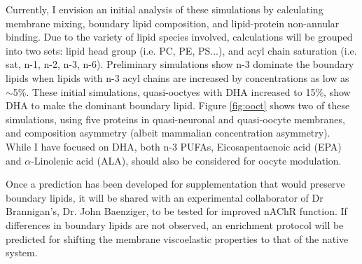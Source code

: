 
Currently, I envision an initial analysis of these simulations by calculating membrane mixing, boundary lipid composition, and lipid-protein non-annular binding. Due to the variety of lipid species involved, calculations will be grouped into two sets: lipid head group (i.e. PC, PE, PS...), and acyl chain saturation (i.e. sat, n-1, n-2, n-3, n-6). Preliminary simulations show n-3 dominate the boundary lipids when lipids with n-3 acyl chains are increased by concentrations as low as $\sim$5\%. These initial simulations, quasi-ooctyes with DHA increased to 15$\%$, show DHA to make the dominant boundary lipid. Figure \ref{fig:ooct} shows two of these simulations, using five proteins in quasi-neuronal and quasi-oocyte membranes, and composition asymmetry (albeit mammalian concentration asymmetry). While I have focused on DHA, both n-3 PUFAs, Eicosapentaenoic acid (EPA) and $\alpha$-Linolenic acid (ALA), should also be considered for oocyte modulation.

Once a prediction has been developed for supplementation that would preserve boundary lipids, it will be shared with an experimental collaborator of Dr Brannigan’s, Dr. John Baenziger, to be tested for improved nAChR function. If differences in boundary lipids are not observed, an enrichment protocol will be predicted for shifting the membrane viscoelastic properties to that of the native system.